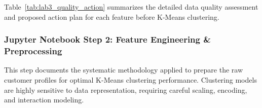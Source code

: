 \documentclass[12pt,a4paper]{article}
\begin{document}
Table~\ref{tab:lab3_quality_action} summarizes the detailed data quality assessment and proposed action plan for each feature before K-Means clustering.
\begin{table}[H]
\centering
\caption{Mall Customer Feature Quality and Action Plan}
\label{tab:lab3_quality_action}
\end{table}

\subsubsection{Jupyter Notebook Step 2: Feature Engineering \& Preprocessing}
This step documents the systematic methodology applied to prepare the raw customer profiles for optimal K-Means clustering performance. Clustering models are highly sensitive to data representation, requiring careful scaling, encoding, and interaction modeling.
\end{document}
